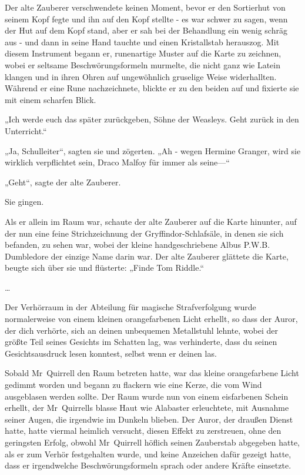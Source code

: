 {Der alte Zauberer verschwendete keinen Moment, bevor er den Sortierhut von seinem Kopf fegte und ihn auf den Kopf stellte - es war schwer zu sagen, wenn der Hut auf dem Kopf stand, aber er sah bei der Behandlung ein wenig schräg aus - und dann in seine Hand tauchte und einen Kristallstab herauszog. Mit diesem Instrument begann er, runenartige Muster auf die Karte zu zeichnen, wobei er seltsame Beschwörungsformeln murmelte, die nicht ganz wie Latein klangen und in ihren Ohren auf ungewöhnlich gruselige Weise widerhallten. Während er eine Rune nachzeichnete, blickte er zu den beiden auf und fixierte sie mit einem scharfen Blick.

„Ich werde euch das später zurückgeben, Söhne der Weasleys. Geht zurück in den Unterricht.“

„Ja, Schulleiter“, sagten sie und zögerten. „Ah - wegen Hermine Granger, wird sie wirklich verpflichtet sein, Draco Malfoy für immer als seine—“

„Geht“, sagte der alte Zauberer.

Sie gingen.

Als er allein im Raum war, schaute der alte Zauberer auf die Karte hinunter, auf der nun eine feine Strichzeichnung der Gryffindor-Schlafsäle, in denen sie sich befanden, zu sehen war, wobei der kleine handgeschriebene Albus P.W.B. Dumbledore der einzige Name darin war. Der alte Zauberer glättete die Karte, beugte sich über sie und flüsterte: „Finde Tom Riddle.“

…

Der Verhörraum in der Abteilung für magische Strafverfolgung wurde normalerweise von einem kleinen orangefarbenen Licht erhellt, so dass der Auror, der dich verhörte, sich an deinen unbequemen Metallstuhl lehnte, wobei der größte Teil seines Gesichts im Schatten lag, was verhinderte, dass du seinen Gesichtsausdruck lesen konntest, selbst wenn er deinen las.

Sobald Mr~Quirrell den Raum betreten hatte, war das kleine orangefarbene Licht gedimmt worden und begann zu flackern wie eine Kerze, die vom Wind ausgeblasen werden sollte. Der Raum wurde nun von einem eisfarbenen Schein erhellt, der Mr~Quirrells blasse Haut wie Alabaster erleuchtete, mit Ausnahme seiner Augen, die irgendwie im Dunkeln blieben. Der Auror, der draußen Dienst hatte, hatte viermal heimlich versucht, diesen Effekt zu zerstreuen, ohne den geringsten Erfolg, obwohl Mr~Quirrell höflich seinen Zauberstab abgegeben hatte, als er zum Verhör festgehalten wurde, und keine Anzeichen dafür gezeigt hatte, dass er irgendwelche Beschwörungsformeln sprach oder andere Kräfte einsetzte.

}
